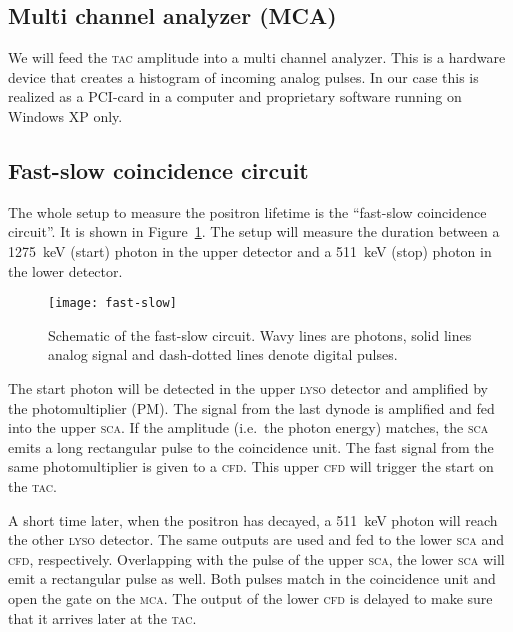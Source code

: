 \documentclass[11pt, english, fleqn, DIV=15, headinclude, BCOR=2cm]{scrreprt}
\begin{document}
\subsection{Multi channel analyzer (MCA)}

We will feed the \textsc{tac} amplitude into a multi channel analyzer. This is a
hardware device that creates a histogram of incoming analog pulses. In our case
this is realized as a PCI-card in a computer and proprietary software running
on Windows XP only.

\subsection{Fast-slow coincidence circuit}

The whole setup to measure the positron lifetime is the \enquote{fast-slow
coincidence circuit}. It is shown in Figure~\ref{fig:fast-slow}. The setup will
measure the duration between a \SI{1275}{\kilo\electronvolt} (start) photon in
the upper detector and a \SI{511}{\kilo\electronvolt} (stop) photon in the
lower detector.

\begin{figure}
    \centering
    \texttt{[image: fast-slow]}
    \caption{%
        Schematic of the fast-slow circuit. Wavy lines are photons, solid lines
        analog signal and dash-dotted lines denote digital pulses.
    }
    \label{fig:fast-slow}
\end{figure}

The start photon will be detected in the upper \textsc{lyso} detector and amplified by
the photomultiplier (PM). The signal from the last dynode is amplified and fed
into the upper \textsc{sca}\@. If the amplitude (i.e.\ the photon energy) matches, the \textsc{sca}
emits a long rectangular pulse to the coincidence unit. The fast signal from
the same photomultiplier is given to a \textsc{cfd}\@. This upper \textsc{cfd} will trigger the
start on the \textsc{tac}\@.

A short time later, when the positron has decayed, a
\SI{511}{\kilo\electronvolt} photon will reach the other \textsc{lyso} detector. The
same outputs are used and fed to the lower \textsc{sca} and \textsc{cfd}, respectively.
Overlapping with the pulse of the upper \textsc{sca}, the lower \textsc{sca} will emit a
rectangular pulse as well. Both pulses match in the coincidence unit and open
the gate on the \textsc{mca}\@. The output of the lower \textsc{cfd} is delayed to make sure that
it arrives later at the \textsc{tac}\@.
\end{document}
